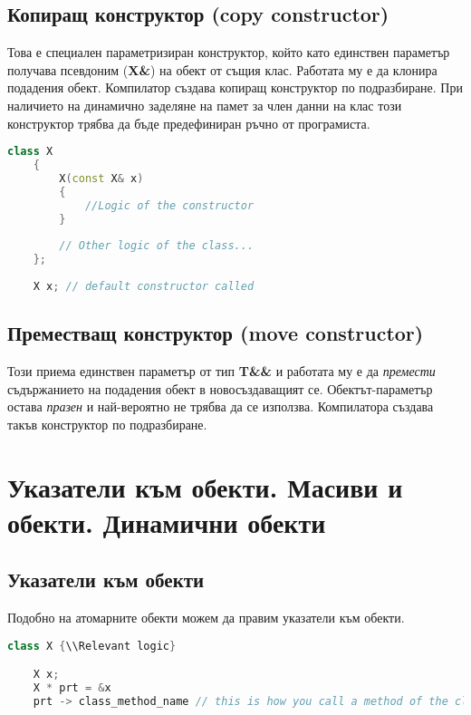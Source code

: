 \documentclass[fleqn,12pt]{article}
\begin{document}
\subsection{Копиращ конструктор (copy constructor)}
Това е специален параметризиран конструктор, който като единствен параметър получава псевдоним (\textbf{X\&}) на обект от същия клас.
Работата му е да клонира подадения обект. Компилатор създава копиращ конструктор по подразбиране. При наличието на динамично заделяне на памет за член данни на клас този конструктор трябва да бъде предефиниран ръчно от програмиста.

\begin{lstlisting}[language=C++, caption=Copy constructor]
    class X
    {
        X(const X& x)
        {
            //Logic of the constructor
        }
    
        // Other logic of the class...
    };
    
    X x; // default constructor called
    \end{lstlisting}
    

\subsection{Преместващ конструктор (move constructor)}
Този приема единствен параметър от тип \textbf{T\&\&} и работата му е да \textit{премести} съдържанието на подадения обект 
в новосъздаващият се. Обектът-параметър остава \textit{празен} и най-вероятно не трябва да се използва.
Компилатора създава такъв конструктор по подразбиране.

\section{Указатели към обекти. Масиви и обекти. Динамични обекти}

\subsection{Указатели към обекти}
Подобно на атомарните обекти можем да правим указатели към обекти. 
\begin{lstlisting}[language=C++, caption=Example creation of pointers]
    class X {\\Relevant logic}

    X x;
    X * prt = &x
    prt -> class_method_name // this is how you call a method of the class through the pointer
\end{lstlisting}
\end{document}
